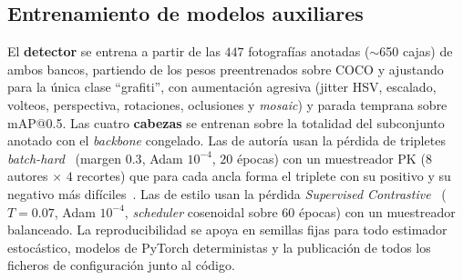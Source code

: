 \subsection{Entrenamiento de modelos auxiliares}
\label{subsec:entrenamiento}
El \textbf{detector} se entrena a partir de las $447$ fotografías anotadas
($\sim$650 cajas) de ambos bancos, partiendo de los pesos preentrenados sobre
COCO y ajustando para la única clase \enquote{grafiti}, con aumentación agresiva
(jitter HSV, escalado, volteos, perspectiva, rotaciones, oclusiones y
\textit{mosaic}) y parada temprana sobre mAP@0.5. Las cuatro \textbf{cabezas} se
entrenan sobre la totalidad del subconjunto anotado con el \textit{backbone}
congelado. Las de autoría usan la pérdida de tripletes
\textit{batch-hard}~\cite{hermans_defense_2017} (margen $0.3$, Adam
$10^{-4}$, $20$ épocas) con un muestreador PK ($8$ autores $\times$ $4$ recortes)
que para cada ancla forma el triplete con su positivo y su negativo más
difíciles~\cite{wu_sampling_2017}. Las de estilo usan la pérdida
\textit{Supervised Contrastive}~\cite{khosla_supervised_2021} ($T=0.07$, Adam
$10^{-4}$, \textit{scheduler} cosenoidal sobre $60$ épocas) con un muestreador
balanceado. La reproducibilidad se apoya en semillas fijas para todo estimador
estocástico, modelos de PyTorch deterministas y la publicación de todos los
ficheros de configuración junto al código.
